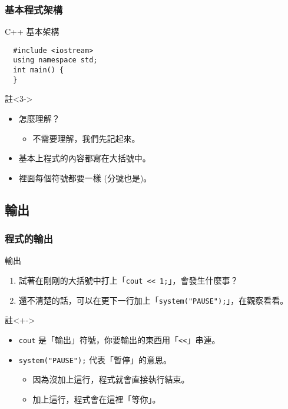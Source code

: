\documentclass[utf8]{beamer}
\begin{document}
\begin{CJK}{UTF8}{bkai}
\begin{frame}[fragile]
  \frametitle{基本程式架構}
  \begin{block}{C++ 基本架構}
    \pause
    \begin{lstlisting}
  #include <iostream>
  using namespace std;
  int main() {
  }
    \end{lstlisting}
  \end{block}
  \begin{exampleblock}{註}<3->
    \begin{itemize}
    \item 怎麼理解？
      \begin{itemize}[<4->]
      \item 不需要理解，我們先記起來。
      \end{itemize}
    \item<5-> 基本上程式的內容都寫在\alert{大括號}中。
    \item<6-> 裡面每個符號都要一樣 (分號也是)。
    \end{itemize}
  \end{exampleblock}
\end{frame}

\subsection{輸出}

\begin{frame}[fragile]
  \frametitle{程式的輸出}
  \begin{block}{輸出}
    \begin{enumerate}[<+->]
      \item 試著在剛剛的大括號中打上「\lstinline{cout << 1;}{}」，會發生什麼事？
      \item 還不清楚的話，可以在更下一行加上「\lstinline{system("PAUSE");}{}」，在觀察看看。
    \end{enumerate}
  \end{block}
  \begin{exampleblock}{註}<+->
    \begin{itemize}
    \item \lstinline{cout}{} 是「輸出」符號，你要輸出的東西用「\lstinline{<<}{}」串連。
    \item<+-> \lstinline{system("PAUSE");}{} 代表「暫停」的意思。
      \begin{itemize}[<+->]
      \item 因為沒加上這行，程式就會直接執行結束。
      \item 加上這行，程式會在這裡「等你」。
      \end{itemize}
    \end{itemize}
  \end{exampleblock}
\end{frame}


\end{CJK}
\end{document}
